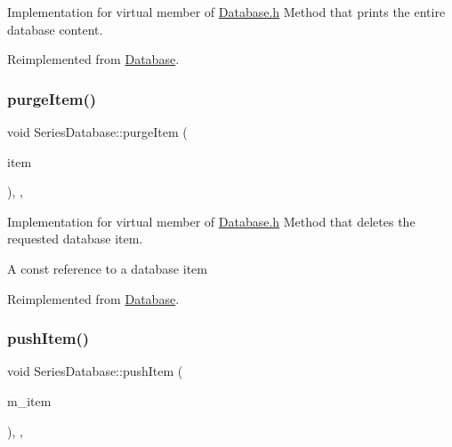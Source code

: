 Implementation for virtual member of \hyperlink{Database_8h_source}{Database.\+h} Method that prints the entire database content. 



Reimplemented from \hyperlink{classDatabase_afa345da530fd5c8dfe0c978917cd6049}{Database}.

\mbox{\label{classSeriesDatabase_a863a35987b5a4de15a121b8b4358e353}} 
\subsubsection{\texorpdfstring{purge\+Item()}{purgeItem()}}
{\footnotesize\ttfamily void Series\+Database\+::purge\+Item (\begin{DoxyParamCaption}\item[{\hyperlink{classDatabaseItem}{Database\+Item}}]{item }\end{DoxyParamCaption})\hspace{0.3cm}{\ttfamily [inline]}, {\ttfamily [override]}, {\ttfamily [virtual]}}



Implementation for virtual member of \hyperlink{Database_8h_source}{Database.\+h} Method that deletes the requested database item. 

A const reference to a database item

Reimplemented from \hyperlink{classDatabase_a8f47437526eeec631f1328fab9bbbc75}{Database}.

\mbox{\label{classSeriesDatabase_a7591f89ab256d9f5a41235f5552e4e23}} 
\subsubsection{\texorpdfstring{push\+Item()}{pushItem()}}
{\footnotesize\ttfamily void Series\+Database\+::push\+Item (\begin{DoxyParamCaption}\item[{const \hyperlink{classDatabaseItem}{Database\+Item} \&}]{m\+\_\+item }\end{DoxyParamCaption})\hspace{0.3cm}{\ttfamily [inline]}, {\ttfamily [override]}, {\ttfamily [virtual]}}



